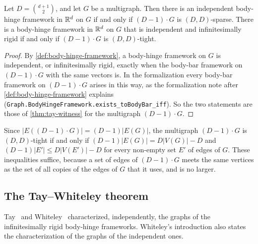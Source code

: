 \begin{lemma}
  \label{lem:edge-multiply-sparse}
  \leanok
  Let $D = \binom{d+1}{2}$, and let $G$ be a multigraph. Then there is
  an independent body-hinge framework in ${\mathbb{R}}^d$ on $G$ if and only if
  $(D-1)\cdot G$ is $(D, D)$-sparse. There is a body-hinge framework in
  ${\mathbb{R}}^d$ on $G$ that is independent and infinitesimally rigid if and
  only if $(D-1)\cdot G$ is $(D, D)$-tight.
\end{lemma}
\begin{proof}
  \leanok
  By \cref{def:body-hinge-framework}, a body-hinge framework on $G$ is
  independent, or infinitesimally rigid, exactly when the body-bar
  framework on $(D-1)\cdot G$ with the same vectors is. In the
  formalization every body-bar framework on $(D-1)\cdot G$ arises in
  this way, as the formalization note after
  \cref{def:body-hinge-framework} explains
  (\texttt{Graph.\allowbreak{}BodyHingeFramework.\allowbreak{}exists\_\allowbreak{}toBodyBar\_\allowbreak{}iff}).
  So the two statements are those of \cref{thm:tay-witness} for the
  multigraph $(D-1)\cdot G$.
\end{proof}

Since $|E((D-1)\cdot G)| = (D-1)|E(G)|$, the multigraph $(D-1)\cdot G$
is $(D, D)$-tight if and only if $(D-1)|E(G)| = D|V(G)| - D$ and
$(D-1)|E'| \le D|V(E')| - D$ for every non-empty set $E'$ of edges of
$G$. These inequalities suffice, because a set of edges of
$(D-1)\cdot G$ meets the same vertices as the set of all copies of the
edges of $G$ that it uses, and is no larger.

\subsection{The Tay--Whiteley theorem}
\label{sec:body-hinge-tay}

Tay~\cite[\S7]{tay1989} and Whiteley~\cite[Theorem~10]{whiteley1988}
characterized, independently, the graphs of the infinitesimally rigid
body-hinge frameworks. Whiteley's introduction also states the
characterization of the graphs of the independent ones.

